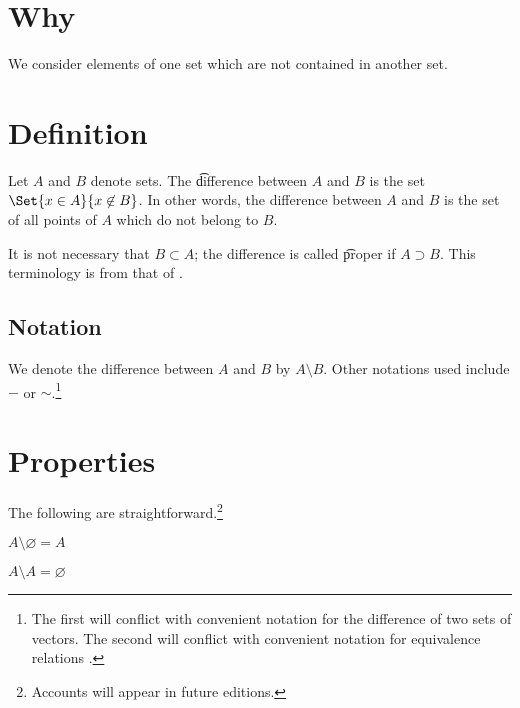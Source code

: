 
\section*{Why}

We consider elements of one set which are not contained in another set.

\section*{Definition}

Let $A$ and $B$ denote sets.
The \t{difference} between $A$ and $B$ is the set $\Set{x \in A}{x \not\in B}$.
In other words, the difference between $A$ and $B$ is the set of all points of $A$ which do not belong to $B$.

It is not necessary that $B \subset A$; the difference is called \t{proper} if $A \supset B$.
This terminology is from that of .

\subsection*{Notation}

We denote the difference between $A$ and $B$ by $A \setminus B$.
Other notations used include $-$ or $\sim$.\footnote{The first will conflict with convenient notation for the difference of two sets of vectors.
The second will conflict with convenient notation for equivalence relations .}





\section*{Properties}

The following are straightforward.\footnote{Accounts will appear in future editions.}

\begin{proposition}
$A \setminus \varnothing = A$
\end{proposition}

\begin{proposition}
$A \setminus A = \varnothing$
\end{proposition}

\blankpage